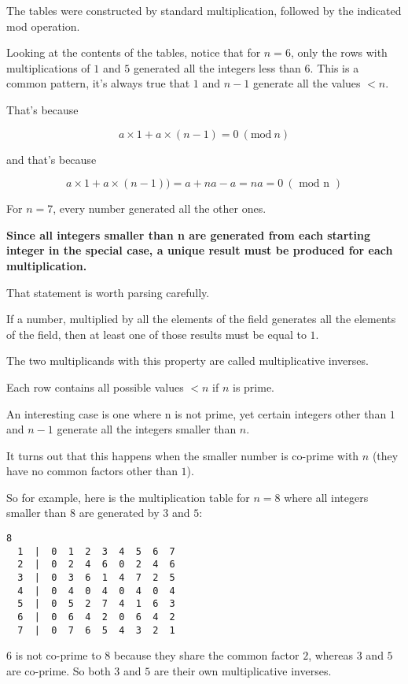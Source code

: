 \documentclass[11pt, oneside]{article}
\begin{document}
The tables were constructed by standard multiplication, followed by the indicated mod operation.

Looking at the contents of the tables, notice that for $n = 6$, only the rows with multiplications of $1$ and $5$ generated all the integers less than $6$.  This is a common pattern, it's always true that $1$ and $n-1$ generate all the values $< n$.  

That's because

\[ a \times 1 + a \times (n-1) = 0 \ (\text{mod} \ n) \]

and that's because

\[ a \times 1 + a \times (n-1)) = a + na - a = na = 0 \ (\text{ mod n }) \]

For $n = 7$, every number generated all the other ones.

\textbf{Since all integers smaller than n are generated from each starting integer in the special case, a unique result must be produced for each multiplication.}

That statement is worth parsing carefully.

If a number, multiplied by all the elements of the field generates all the elements of the field, then at least one of those results must be equal to $1$.  

The two multiplicands with this property are called multiplicative inverses. 

Each row contains all possible values $< n$ if $n$ is prime.

An interesting case is one where n is not prime, yet certain integers other than $1$ and $n-1$ generate all the integers smaller than $n$.  

It turns out that this happens when the smaller number is co-prime with $n$ (they have no common factors other than $1$).

So for example, here is the multiplication table for $n = 8$ where all integers smaller than $8$ are generated by $3$ and $5$:

\begin{verbatim}
8
  1  |  0  1  2  3  4  5  6  7
  2  |  0  2  4  6  0  2  4  6
  3  |  0  3  6  1  4  7  2  5
  4  |  0  4  0  4  0  4  0  4
  5  |  0  5  2  7  4  1  6  3
  6  |  0  6  4  2  0  6  4  2
  7  |  0  7  6  5  4  3  2  1
\end{verbatim}

$6$ is not co-prime to $8$ because they share the common factor $2$, whereas $3$ and $5$ are co-prime.  So both $3$ and $5$ are their own multiplicative inverses.
\end{document}
